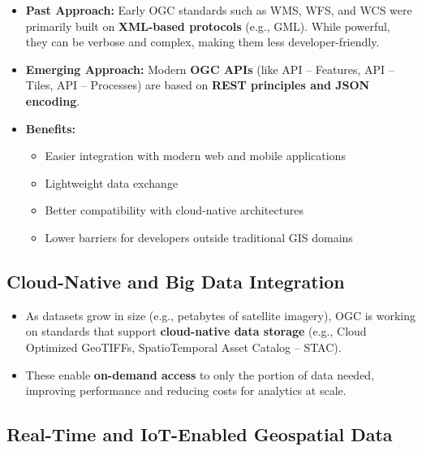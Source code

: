 \documentclass[
  11pt,
  letterpaper,
]{book}
\providecommand{\tightlist}{%
  \setlength{\itemsep}{0pt}\setlength{\parskip}{0pt}}
\begin{document}
\begin{itemize}
\tightlist
\item
  \textbf{Past Approach:} Early OGC standards such as WMS, WFS, and WCS
  were primarily built on \textbf{XML-based protocols} (e.g., GML).
  While powerful, they can be verbose and complex, making them less
  developer-friendly.\\
\item
  \textbf{Emerging Approach:} Modern \textbf{OGC APIs} (like API --
  Features, API -- Tiles, API -- Processes) are based on \textbf{REST
  principles and JSON encoding}.\\
\item
  \textbf{Benefits:}

  \begin{itemize}
  \tightlist
  \item
    Easier integration with modern web and mobile applications\\
  \item
    Lightweight data exchange\\
  \item
    Better compatibility with cloud-native architectures\\
  \item
    Lower barriers for developers outside traditional GIS domains
  \end{itemize}
\end{itemize}

\subsection{Cloud-Native and Big Data
Integration}\label{cloud-native-and-big-data-integration}

\begin{itemize}
\tightlist
\item
  As datasets grow in size (e.g., petabytes of satellite imagery), OGC
  is working on standards that support \textbf{cloud-native data
  storage} (e.g., Cloud Optimized GeoTIFFs, SpatioTemporal Asset Catalog
  -- STAC).\\
\item
  These enable \textbf{on-demand access} to only the portion of data
  needed, improving performance and reducing costs for analytics at
  scale.
\end{itemize}

\subsection{Real-Time and IoT-Enabled Geospatial
Data}\label{real-time-and-iot-enabled-geospatial-data}
\end{document}
